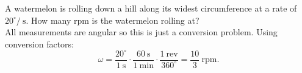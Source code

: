 A watermelon is rolling down a hill along its widest circumference at a rate of $20^{\circ} /\ \text{s}$. How many rpm is the watermelon rolling at?
\[\]
All measurements are angular so this is just a conversion problem. Using conversion factors:
$$
\omega = \frac{20^{\circ}}{1\ \text{s}} \cdot \frac{60\ \text{s}}{1\ \text{min}} \cdot \frac{1\ \text{rev}}{360^{\circ}} = \frac{10}{3}\ \text{rpm}.
$$

